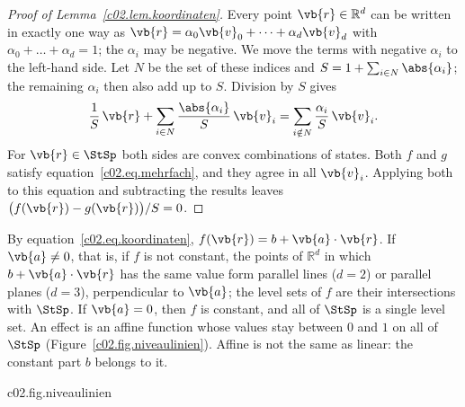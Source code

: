 \begin{vertiefung}
\begin{proof}[Proof of Lemma~\ref{c02.lem.koordinaten}]
    Every point $\vb{r} \in \mathbb{R}^d$ can be written in exactly one way as
    $\vb{r} = \alpha_0 \vb{v}_0 + \dots + \alpha_d \vb{v}_d$ with
    $\alpha_0 + \dots + \alpha_d = 1$; the $\alpha_i$ may be negative. We move the terms
    with negative $\alpha_i$ to the left-hand side. Let $N$ be the set of these indices and
    $S = 1 + \sum_{i \in N} \abs{\alpha_i}$; the remaining $\alpha_i$ then also add up to
    $S$. Division by $S$ gives
    \begin{equation*}
      \frac{1}{S}\,\vb{r} + \sum_{i \in N} \frac{\abs{\alpha_i}}{S}\,\vb{v}_i
      = \sum_{i \notin N} \frac{\alpha_i}{S}\,\vb{v}_i .
    \end{equation*}
    For $\vb{r} \in \StSp$ both sides are convex combinations of states. Both $f$ and $g$
    satisfy equation~\eqref{c02.eq.mehrfach}, and they agree in all $\vb{v}_i$. Applying
    both to this equation and subtracting the results leaves
    $\bigl(f(\vb{r}) - g(\vb{r})\bigr)/S = 0$.
  \end{proof}
\end{vertiefung}

By equation~\eqref{c02.eq.koordinaten}, $f(\vb{r}) = b + \vb{a}\cdot\vb{r}$. If
$\vb{a} \neq 0$, that is, if $f$ is not constant, the points of $\mathbb{R}^d$ in which
$b + \vb{a}\cdot\vb{r}$ has the same value form parallel lines ($d = 2$) or parallel
planes ($d = 3$), perpendicular to $\vb{a}$; the level sets of $f$ are their intersections
with $\StSp$. If $\vb{a} = 0$, then $f$ is constant, and all of $\StSp$ is a single level
set. An effect is an affine function whose values stay between $0$ and $1$ on all of $\StSp$
(Figure~\ref{c02.fig.niveaulinien}). Affine is not the same as linear: the constant part
$b$ belongs to it.

\begin{tpcfigure}{c02.fig.niveaulinien}
  \caption{An effect is an affine function with values in $[0,1]$. (a) On the segment its
    graph is a straight line; it is fixed by the values $q_0$ and $q_1$ in the end points,
    here $\tfrac34$ and $\tfrac14$. In the state $x$, a quarter of the way from $s_0$ to
    $s_1$, one reads off $f(x) = \tfrac58$. (b) On the square the level lines of the effect
    $f(\vb{r}) = \tfrac12 + \tfrac14 r_x + \tfrac14 r_y$ are parallel lines perpendicular
    to $\vb{a} = (\tfrac14, \tfrac14)$. The value $0$ is taken only in the lower left
    corner, the value $1$ only in the upper right corner; in the state
    $x = (\tfrac12, 0)$ we have $f(x) = \tfrac58$.}
\end{tpcfigure}

